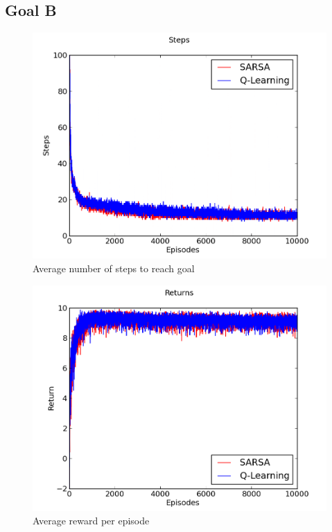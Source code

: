 \documentclass[a4paper]{article}
\begin{document}
\newpage
\subsection{Goal B}

\begin{figure}[htbp!]
\center
\includegraphics[scale=0.75]{B/steps.png}
\caption{Average number of steps to reach goal}
\end{figure}

\begin{figure}[htbp!]
\center
\includegraphics[scale=0.75]{B/returns.png}
\caption{Average reward per episode}
\end{figure}
\end{document}

